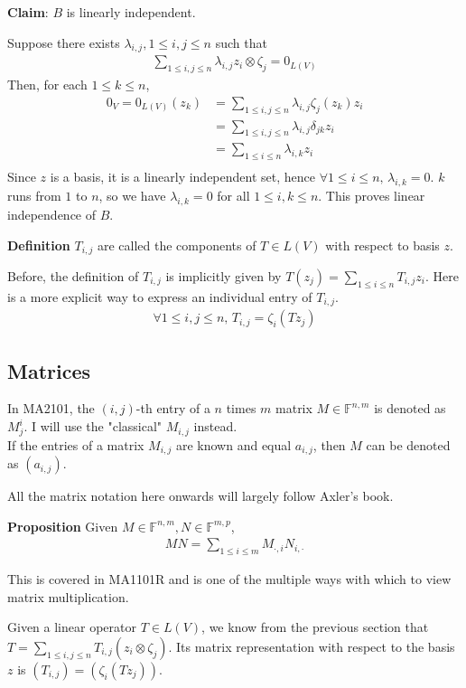 \documentclass{article}
\begin{document}
\textbf{Claim}: $B$ is linearly independent.

Suppose there exists $\lambda_{i,j}, 1\leq i,j\leq n$ such that \begin{align*}
	\sum_{1\leq i,j\leq n}\lambda_{i,j}z_i \otimes \zeta_j=0_{L(V)}
\end{align*}
Then, for each $1\leq k\leq n$, 
\begin{align*}
	0_V=0_{L(V)}(z_k)&=\sum_{1\leq i,j\leq n}\lambda_{i,j}\zeta_j(z_k)z_i \\
	&=\sum_{1\leq i,j\leq n}\lambda_{i,j}\delta_{jk}z_i\\
	&=\sum_{1\leq i\leq n}\lambda_{i,k}z_i \\
\end{align*}
Since $z$ is a basis, it is a linearly independent set, hence $\forall 1\leq i\leq n,\, \lambda_{i,k}=0$. $k$ runs from $1$ to $n$, so we have $\lambda_{i,k}=0$ for all $1\leq i,k\leq n$. This proves linear independence of $B$. 

\textbf{Definition} $T_{i,j}$ are called the components of $T\in L(V)$ with respect to basis $z$.

Before, the definition of $T_{i,j}$ is implicitly given by $T(z_j)=\sum_{1\leq i\leq n}T_{i,j}z_i$. Here is a more explicit way to express an individual entry of $T_{i,j}$.
\begin{align*}
	\forall 1\leq i,j\leq n,\, T_{i,j}=\zeta_{i}(Tz_j)
\end{align*}

\subsection{Matrices}
In MA2101, the $(i,j)$-th entry of a $n$ times $m$ matrix $M\in \mathbb{F}^{n,m}$ is denoted as $M^i_j$.
I will use the "classical" $M_{i,j}$ instead.\\
If the entries of a matrix $M_{i,j}$ are known and equal $a_{i,j}$, then $M$ can be denoted as $(a_{i,j})$.

All the matrix notation here onwards will largely follow Axler's book.

\textbf{Proposition} Given $M\in \mathbb{F}^{n,m}, N\in \mathbb{F}^{m,p}$,
\begin{align*}
	MN = \sum_{1\leq i\leq m}M_{\cdot,i}N_{i,\cdot}
\end{align*}

This is covered in MA1101R and is one of the multiple ways with which to view matrix multiplication.

Given a linear operator $T\in L(V)$, we know from the previous section that $T=\sum_{1\leq i,j\leq n}T_{i,j}(z_i\otimes \zeta_j)$.
Its matrix representation with respect to the basis $z$ is $(T_{i,j})=(\zeta_i(Tz_j))$.
\end{document}
